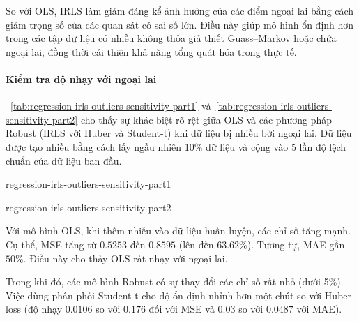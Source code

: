 So với OLS, IRLS làm giảm đáng kể ảnh hưởng của các điểm ngoại lai bằng cách
giảm trọng số của các quan sát có sai số lớn. Điều này giúp mô hình ổn định hơn
trong các tập dữ liệu có nhiễu không thỏa giả thiết Guass--Markov hoặc chứa
ngoại lai, đồng thời cải thiện khả năng tổng quát hóa trong thực tế.

\paragraph{Kiểm tra độ nhạy với ngoại lai}

\tablename~\ref{tab:regression-irls-outliers-sensitivity-part1}
và~\ref{tab:regression-irls-outliers-sensitivity-part2} cho thấy sự khác biệt
rõ rệt giữa OLS và các phương pháp Robust (IRLS với Huber và Student-t) khi dữ
liệu bị nhiễu bởi ngoại lai. Dữ liệu được tạo nhiễu bằng cách lấy ngẫu nhiên
10\% dữ liệu và cộng vào 5 lần độ lệch chuẩn của dữ liệu ban đầu.

\begin{table}[htbp]
  \centering
  \caption{So sánh độ nhạy với ngoại lai của các mô hình OLS, IRLS (Huber và
  Student-t) (phần 1)}
  \label{tab:regression-irls-outliers-sensitivity-part1}
  {regression-irls-outliers-sensitivity-part1}
\end{table}

\begin{table}[htbp]
  \centering
  \caption{So sánh độ nhạy với ngoại lai của các mô hình OLS, IRLS (Huber và
  Student-t) (phần 2)}
  \label{tab:regression-irls-outliers-sensitivity-part2}
  {regression-irls-outliers-sensitivity-part2}
\end{table}

Với mô hình OLS, khi thêm nhiễu vào dữ liệu huấn luyện, các chỉ số tăng
mạnh. Cụ thể, MSE tăng từ $0.5253$ đến $0.8595$ (lên đến $63.62\%$). Tương tự,
MAE gần $50\%$. Điều này cho thấy OLS rất nhạy với ngoại lai.

Trong khi đó, các mô hình Robust có sự thay đổi các chỉ số rất nhỏ (dưới 5\%).
Việc dùng phân phối Student-t cho độ ổn định nhỉnh hơn một chút so với Huber
loss (độ nhạy $0.0106$ so với $0.176$ đối với MSE và $0.03$ so với $0.0487$ với
MAE).

